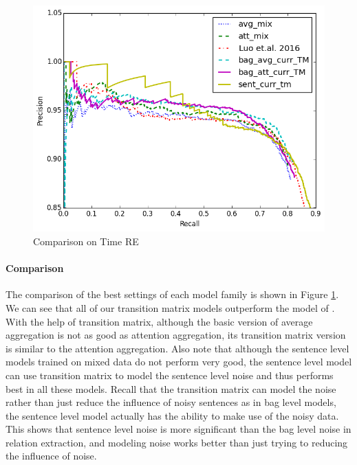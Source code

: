 \begin{figure}[htbp]
\begin{center}
\includegraphics[width=0.9\linewidth]{figures/best_cmp_exp_overall.png}
\caption{Comparison on Time RE}
\label{fig: cmp_luo}
\end{center}
\end{figure}
 
\paragraph{Comparison}
The comparison of the best settings of each model family is shown in Figure \ref{fig: cmp_luo}. We can see that all of our transition matrix models outperform the model of \cite{luo2016temporal}. With the help of transition matrix, although the basic version of average aggregation is not as good as attention aggregation, its transition matrix version is similar to the attention aggregation. Also note that although the sentence level models trained on mixed data do not perform very good, the sentence level model can use transition matrix to model the sentence level noise and thus performs best in all these models. Recall that the transition matrix can model the noise rather than just reduce the influence of noisy sentences as in bag level models, the sentence level model actually has the ability to make use of the noisy data. This shows that sentence level noise is more significant than the bag level noise in relation extraction, and modeling noise works better than just trying to reducing the influence of noise.


